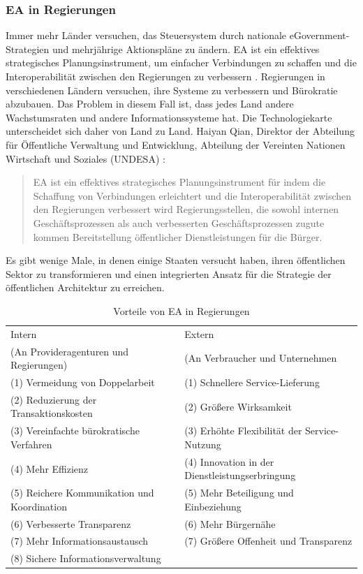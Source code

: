 \documentclass[
	doc,
	a4paper,
	helv
	]{apa6}
\begin{document}
\subsubsection{EA in Regierungen}
Immer mehr Länder versuchen, das Steuersystem durch nationale eGovernment-Strategien und mehrjährige Aktionspläne zu ändern. EA ist ein effektives strategisches Planungsinstrument, um  einfacher Verbindungen zu schaffen und die Interoperabilität zwischen den Regierungen zu verbessern \autocite{Bakar2016}. Regierungen in verschiedenen Ländern versuchen, ihre Systeme zu verbessern und Bürokratie abzubauen. Das Problem in diesem Fall ist, dass jedes Land andere Wachstumsraten und andere Informationssysteme hat. Die Technologiekarte unterscheidet sich daher von Land zu Land. Haiyan Qian, Direktor der Abteilung für Öffentliche Verwaltung und Entwicklung, Abteilung der Vereinten Nationen Wirtschaft und Soziales (UNDESA) :
\begin{quote}
\glqq EA ist ein effektives strategisches Planungsinstrument für indem die Schaffung von Verbindungen erleichtert und die Interoperabilität zwischen den Regierungen verbessert wird Regierungsstellen, die sowohl internen Geschäftsprozessen als auch verbesserten Geschäftsprozessen zugute kommen Bereitstellung öffentlicher Dienstleistungen für die Bürger.\grqq
\autocite{Pallab2010}
\end{quote}
Es gibt wenige Male, in denen einige Staaten versucht haben, ihren öffentlichen Sektor zu transformieren und einen integrierten Ansatz für die Strategie der öffentlichen Architektur zu erreichen.


\begin{table}[!htbp]
\caption{Vorteile von EA in Regierungen \autocite{Pallab2010}}
\begin{center}
\begin{tabularx}{\textwidth}{|X|X|}
\hline
Intern & Extern \\
(An Provideragenturen und Regierungen) & (An Verbraucher und Unternehmen \\\hline
(1) Vermeidung von Doppelarbeit				& (1) Schnellere Service-Lieferung \\
(2) Reduzierung der Transaktionskosten		& (2) Größere Wirksamkeit \\
(3) Vereinfachte bürokratische Verfahren	& (3) Erhöhte Flexibilität der Service-Nutzung \\
(4) Mehr Effizienz							& (4) Innovation in der Dienstleistungserbringung \\
(5) Reichere Kommunikation und Koordination	& (5) Mehr Beteiligung und Einbeziehung \\
(6) Verbesserte Transparenz					& (6) Mehr Bürgernähe \\
(7) Mehr Informationsaustausch				& (7) Größere Offenheit und Transparenz \\
(8) Sichere Informationsverwaltung			& \\\hline
\end{tabularx}
\end{center}
\label{tab:InternExtern}
\end{table}
\end{document}
